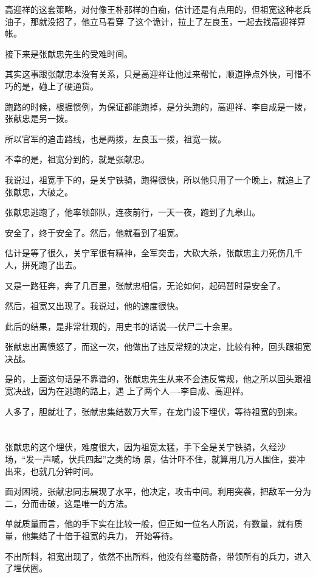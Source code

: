 \documentclass[11pt,a4paper,onecolumn]{article}
\begin{document}
高迎祥的这套策略，对付像王朴那样的白痴，估计还是有点用的，但祖宽这种老兵油子，那就没招了，他立马看穿
了这个诡计，拉上了左良玉，一起去找高迎祥算帐。

接下来是张献忠先生的受难时间。

其实这事跟张献忠本没有关系，只是高迎祥让他过来帮忙，顺道挣点外快，可惜不巧的是，碰上了硬通货。

跑路的时候，根据惯例，为保证都能跑掉，是分头跑的，高迎祥、李自成是一拨，张献忠是另一拨。

所以官军的追击路线，也是两拨，左良玉一拨，祖宽一拨。

不幸的是，祖宽分到的，就是张献忠。

我说过，祖宽手下的，是关宁铁骑，跑得很快，所以他只用了一个晚上，就追上了张献忠，大破之。

张献忠逃跑了，他率领部队，连夜前行，一天一夜，跑到了九皋山。

安全了，终于安全了。然后，他就看到了祖宽。

估计是等了很久，关宁军很有精神，全军突击，大砍大杀，张献忠主力死伤几千人，拼死跑了出去。

又是一路狂奔，奔了几百里，张献忠相信，无论如何，起码暂时是安全了。

然后，祖宽又出现了。我说过，他的速度很快。

此后的结果，是非常壮观的，用史书的话说----伏尸二十余里。

张献忠出离愤怒了，而这一次，他做出了违反常规的决定，比较有种，回头跟祖宽决战。

是的，上面这句话是不靠谱的，张献忠先生从来不会违反常规，他之所以回头跟祖宽决战，因为在逃跑的路上，遇
上了两个人----李自成、高迎祥。

人多了，胆就壮了，张献忠集结数万大军，在龙门设下埋伏，等待祖宽的到来。

\section[\thesection]{}

张献忠的这个埋伏，难度很大，因为祖宽太猛，手下全是关宁铁骑，久经沙场，``发一声喊，伏兵四起''之类的场
景，估计吓不住，就算用几万人围住，要冲出来，也就几分钟时间。

面对困境，张献忠同志展现了水平，他决定，攻击中间。利用突袭，把敌军一分为二，分而击破，这是唯一的方法。

单就质量而言，他的手下实在比较一般，但正如一位名人所说，有数量，就有质量，他集结了十倍于祖宽的兵力，
开始等待。

不出所料，祖宽出现了，依然不出所料，他没有丝毫防备，带领所有的兵力，进入了埋伏圈。
\end{document}
